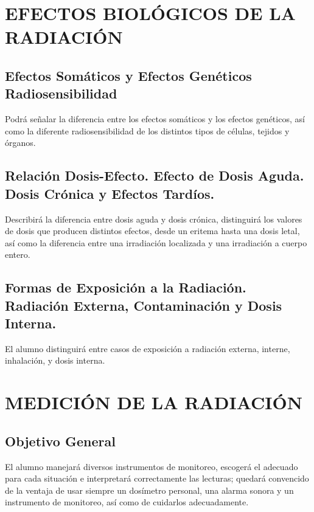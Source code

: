 \section{EFECTOS BIOLÓGICOS DE LA RADIACIÓN}

\subsection{Efectos Somáticos y Efectos Genéticos Radiosensibilidad}
Podrá señalar la diferencia entre los efectos somáticos y los efectos genéticos, así como la diferente radiosensibilidad de los distintos tipos de células, tejidos y órganos.

\subsection{Relación Dosis-Efecto. Efecto de Dosis Aguda. Dosis Crónica y Efectos Tardíos.}
Describirá la diferencia entre dosis aguda y dosis crónica, distinguirá los valores de dosis que producen distintos efectos, desde un eritema hasta una dosis letal, así como la diferencia entre una irradiación localizada y una irradiación a cuerpo entero.

\subsection{Formas de Exposición a la Radiación. Radiación Externa, Contaminación y Dosis Interna.}
El alumno distinguirá entre casos de exposición a radiación externa, interne, inhalación, y dosis interna.

\section{MEDICIÓN DE LA RADIACIÓN}

\subsection{Objetivo General}
El alumno manejará diversos instrumentos de monitoreo, escogerá el adecuado para cada situación e interpretará correctamente las lecturas; quedará convencido de la ventaja de usar siempre un dosímetro personal, una alarma sonora y un instrumento de monitoreo, así como de cuidarlos adecuadamente.

